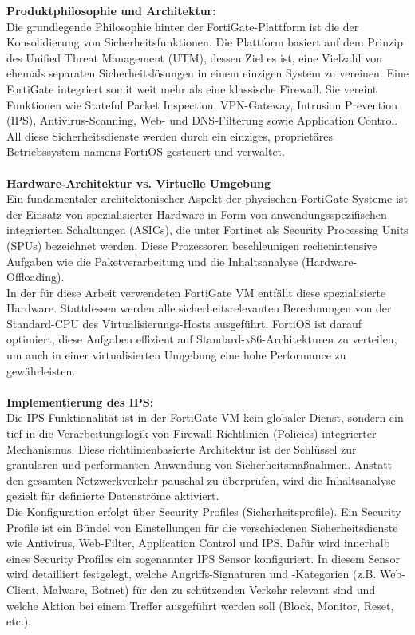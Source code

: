 \textbf{Produktphilosophie und Architektur:}\\
Die grundlegende Philosophie hinter der FortiGate-Plattform ist die der Konsolidierung von Sicherheitsfunktionen. Die Plattform basiert auf dem Prinzip des Unified Threat Management (UTM), dessen Ziel es ist, eine Vielzahl von ehemals separaten Sicherheitslösungen in einem einzigen System zu vereinen. Eine FortiGate integriert somit weit mehr als eine klassische Firewall. Sie vereint Funktionen wie Stateful Packet Inspection, VPN-Gateway, Intrusion Prevention (IPS), Antivirus-Scanning, Web- und DNS-Filterung sowie Application Control. All diese Sicherheitsdienste werden durch ein einziges, proprietäres Betriebssystem namens FortiOS gesteuert und verwaltet. \cite{Forti}\\\\

\textbf{Hardware-Architektur vs. Virtuelle Umgebung}\\
Ein fundamentaler architektonischer Aspekt der physischen FortiGate-Systeme ist der Einsatz von spezialisierter Hardware in Form von anwendungsspezifischen integrierten Schaltungen (ASICs), die unter Fortinet als Security Processing Units (SPUs) bezeichnet werden. Diese Prozessoren beschleunigen rechenintensive Aufgaben wie die Paketverarbeitung und die Inhaltsanalyse (Hardware-Offloading). \\

In der für diese Arbeit verwendeten FortiGate VM entfällt diese spezialisierte Hardware. Stattdessen werden alle sicherheitsrelevanten Berechnungen von der Standard-CPU des Virtualisierungs-Hosts ausgeführt. FortiOS ist darauf optimiert, diese Aufgaben effizient auf Standard-x86-Architekturen zu verteilen, um auch in einer virtualisierten Umgebung eine hohe Performance zu gewährleisten.\cite{Forti2}\\\\

\textbf{Implementierung des IPS:}\\
Die IPS-Funktionalität ist in der FortiGate VM kein globaler Dienst, sondern ein tief in die Verarbeitungslogik von Firewall-Richtlinien (Policies) integrierter Mechanismus. Diese richtlinienbasierte Architektur ist der Schlüssel zur granularen und performanten Anwendung von Sicherheitsmaßnahmen. Anstatt den gesamten Netzwerkverkehr pauschal zu überprüfen, wird die Inhaltsanalyse gezielt für definierte Datenströme aktiviert.\\

Die Konfiguration erfolgt über Security Profiles (Sicherheitsprofile). Ein Security Profile ist ein Bündel von Einstellungen für die verschiedenen Sicherheitsdienste wie Antivirus, Web-Filter, Application Control und IPS. Dafür wird innerhalb eines Security Profiles ein sogenannter IPS Sensor konfiguriert. In diesem Sensor wird detailliert festgelegt, welche Angriffs-Signaturen und -Kategorien (z.B. Web-Client, Malware, Botnet) für den zu schützenden Verkehr relevant sind und welche Aktion bei einem Treffer ausgeführt werden soll (Block, Monitor, Reset, etc.).\\

